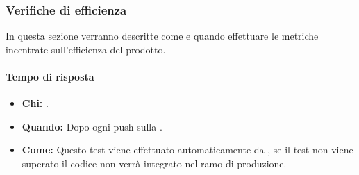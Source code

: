 \subsubsection{Verifiche di efficienza}
In questa sezione verranno descritte come e quando effettuare le metriche incentrate sull'efficienza del prodotto.

\paragraph{Tempo di risposta}
\begin{itemize}
\item \textbf{Chi:} .
\item \textbf{Quando:} Dopo ogni push sulla .
\item \textbf{Come:} Questo test viene effettuato automaticamente da , se il test non viene superato il codice non verrà integrato nel ramo di produzione.
\end{itemize}
